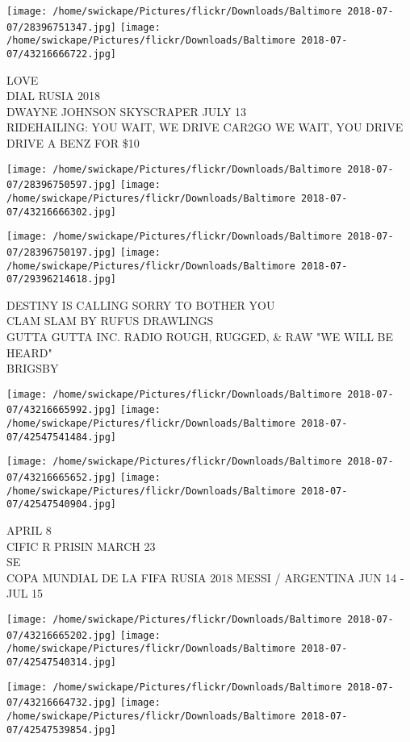 \documentclass[10pt,letterpaper]{article}
\begin{document}
\texttt{[image: /home/swickape/Pictures/flickr/Downloads/Baltimore 2018-07-07/28396751347.jpg]}
\texttt{[image: /home/swickape/Pictures/flickr/Downloads/Baltimore 2018-07-07/43216666722.jpg]}

LOVE\\
DIAL RUSIA 2018\\
DWAYNE JOHNSON SKYSCRAPER JULY 13\\
RIDEHAILING: YOU WAIT, WE DRIVE CAR2GO WE WAIT, YOU DRIVE DRIVE A BENZ FOR \$10
\pagebreak

\texttt{[image: /home/swickape/Pictures/flickr/Downloads/Baltimore 2018-07-07/28396750597.jpg]}
\texttt{[image: /home/swickape/Pictures/flickr/Downloads/Baltimore 2018-07-07/43216666302.jpg]}

\texttt{[image: /home/swickape/Pictures/flickr/Downloads/Baltimore 2018-07-07/28396750197.jpg]}
\texttt{[image: /home/swickape/Pictures/flickr/Downloads/Baltimore 2018-07-07/29396214618.jpg]}

DESTINY IS CALLING SORRY TO BOTHER YOU\\
CLAM SLAM BY RUFUS DRAWLINGS\\
GUTTA GUTTA INC. RADIO ROUGH, RUGGED, \& RAW "WE WILL BE HEARD"\\
BRIGSBY
\pagebreak

\texttt{[image: /home/swickape/Pictures/flickr/Downloads/Baltimore 2018-07-07/43216665992.jpg]}
\texttt{[image: /home/swickape/Pictures/flickr/Downloads/Baltimore 2018-07-07/42547541484.jpg]}

\texttt{[image: /home/swickape/Pictures/flickr/Downloads/Baltimore 2018-07-07/43216665652.jpg]}
\texttt{[image: /home/swickape/Pictures/flickr/Downloads/Baltimore 2018-07-07/42547540904.jpg]}

APRIL 8\\
CIFIC R PRISIN MARCH 23\\
SE\\
COPA MUNDIAL DE LA FIFA RUSIA 2018 MESSI / ARGENTINA JUN 14 {-} JUL 15
\pagebreak

\texttt{[image: /home/swickape/Pictures/flickr/Downloads/Baltimore 2018-07-07/43216665202.jpg]}
\texttt{[image: /home/swickape/Pictures/flickr/Downloads/Baltimore 2018-07-07/42547540314.jpg]}

\texttt{[image: /home/swickape/Pictures/flickr/Downloads/Baltimore 2018-07-07/43216664732.jpg]}
\texttt{[image: /home/swickape/Pictures/flickr/Downloads/Baltimore 2018-07-07/42547539854.jpg]}
\end{document}
